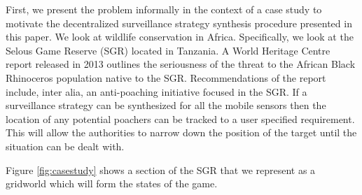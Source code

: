 First, we present the problem informally in the context of a case study to motivate the decentralized surveillance strategy synthesis procedure presented in this paper. We look at wildlife conservation in Africa. Specifically, we look at the Selous Game Reserve (SGR) located in Tanzania. A World Heritage Centre report released in 2013 \cite{UN13} outlines the seriousness of the threat to the African Black Rhinoceros population native to the SGR. Recommendations of the report include, inter alia, an anti-poaching initiative focused in the SGR. If a surveillance strategy can be synthesized for all the mobile sensors then the location of any potential poachers can be tracked to a user specified requirement. This will allow the authorities to narrow down the position of the target until the situation can be dealt with. 

Figure \ref{fig:casestudy} shows a section of the SGR that we represent as a gridworld which will form the states of the game. 

